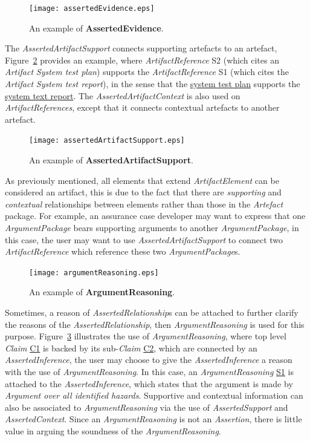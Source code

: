 \begin{figure}[ht]
	\centering
	\texttt{[image: assertedEvidence.eps]}
	\caption{An example of \textbf{AssertedEvidence}.}
	\label{fig:assertedEvidence}
\end{figure}

The \textit{AssertedArtifactSupport} connects supporting artefacts to an artefact, Figure~\ref{fig:assertedArtifactSupport} provides an example, where \textit{ArtifactReference} S2 (which cites an \textit{Artifact} \textit{System test plan}) supports the \textit{ArtifactReference} S1 (which cites the \textit{Artifact} \textit{System test report}), in the sense that the \underline{system test plan} supports the \underline{system text report}. 
The \textit{AssertedArtifactContext} is also used on \textit{ArtifactReferences}, except that it connects contextual artefacts to another artefact.

\begin{figure}
	\centering
	\texttt{[image: assertedArtifactSupport.eps]}
	\caption{An example of \textbf{AssertedArtifactSupport}.}
	\label{fig:assertedArtifactSupport}
\end{figure}

As previously mentioned, all elements that extend \textit{ArtifactElement} can be considered an artifact, this is due to the fact that there are \textit{supporting} and \textit{contextual} relationships between elements rather than those in the \textit{Artefact} package. 
For example, an assurance case developer may want to express that one \textit{ArgumentPackage} bears supporting arguments to another \textit{ArgumentPackage}, in this case, the user may want to use \textit{AssertedArtifactSupport} to connect two \textit{ArtifactReference} which reference these two \textit{ArgumentPackage}s. 

\begin{figure}
	\centering
	\texttt{[image: argumentReasoning.eps]}
	\caption{An example of \textbf{ArgumentReasoning}.}
	\label{fig:argumentReasoning}
\end{figure}

Sometimes, a reason of \textit{AssertedRelationship}s can be attached to further clarify the reasons of the \textit{AssertedRelationship}, then \textit{ArgumentReasoning} is used for this purpose. Figure~\ref{fig:argumentReasoning} illustrates the use of \textit{ArgumentReasoning}, where top level \textit{Claim} \underline{C1} is backed by its sub-\textit{Claim} \underline{C2}, which are connected by an \textit{AssertedInference}, the user may choose to give the \textit{AssertedInference} a reason with the use of \textit{ArgumentReasoning}. 
In this case, an \textit{ArgumentReasoning} \underline{S1} is attached to the \textit{AssertedInference}, which states that the argument is made by \textit{Argument over all identified hazards}. 
Supportive and contextual information can also be associated to \textit{ArgumentReasoning} via the use of \textit{AssertedSupport} and \textit{AssertedContext}. 
Since an \textit{ArgumentReasoning} is not an \textit{Assertion}, there is little value in arguing the soundness of the \textit{ArgumentReasoning}. 



